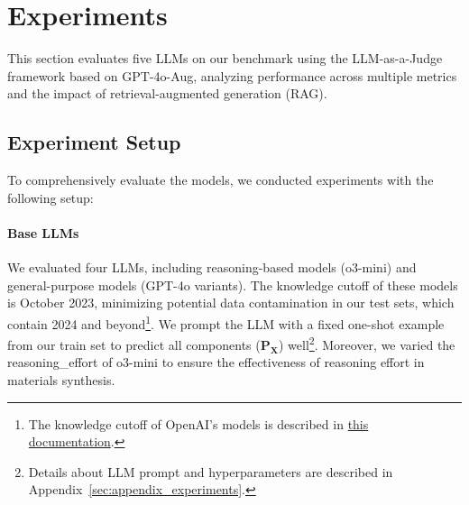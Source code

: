 \section{Experiments}
\label{sec:experiment}


This section evaluates five LLMs on our benchmark using the LLM-as-a-Judge framework based on GPT-4o-Aug, analyzing performance across multiple metrics and the impact of retrieval-augmented generation (RAG).

\subsection{Experiment Setup}
\label{subsec:experiment_setup}

To comprehensively evaluate the models, we conducted experiments with the following setup:

\paragraph*{Base LLMs}
We evaluated four LLMs, including reasoning-based models (o3-mini) and general-purpose models (GPT-4o variants). The knowledge cutoff of these models is October 2023, minimizing potential data contamination in our test sets, which contain 2024 and beyond\footnote{The knowledge cutoff of OpenAI's models is described in \href{https://platform.openai.com/docs/models}{this documentation}.}. We prompt the LLM with a fixed one-shot example from our train set to predict all components ($\mathbf{P_X}$) well\footnote{Details about LLM prompt and hyperparameters are described in Appendix~\ref{sec:appendix_experiments}.}. Moreover, we varied the reasoning\_effort of o3-mini to ensure the effectiveness of reasoning effort in materials synthesis.



